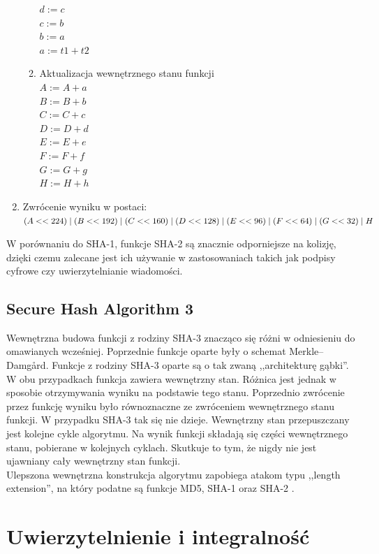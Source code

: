 \begin{enumerate}
\begin{enumerate}
		        $d := c$ \\
		        $c := b$ \\
		        $b := a$ \\
		        $a := t1 + t2$
			\item Aktualizacja wewnętrznego stanu funkcji \\
				$A := A + a$ \\
				$B := B + b$ \\
				$C := C + c$ \\
				$D := D + d$ \\
				$E := E + e$ \\
				$F := F + f$ \\
				$G := G + g$ \\
				$H := H + h$ 
		\end{enumerate}
	\item Zwrócenie wyniku w postaci: \\
		$(A << 224) \mathrel{|} (B << 192) \mathrel{|} (C << 160) \mathrel{|} \\ 
		 (D << 128) \mathrel{|} (E << 96) \mathrel{|} (F << 64) \mathrel{|} (G << 32) \mathrel{|} H$
\end{enumerate}
W porównaniu do SHA-1, funkcje SHA-2 są znacznie odporniejsze na kolizję, dzięki czemu zalecane jest ich używanie w zastosowaniach takich jak podpisy cyfrowe czy uwierzytelnianie wiadomości.

\subsection{Secure Hash Algorithm 3}
Wewnętrzna budowa funkcji z rodziny SHA-3 znacząco się różni w odniesieniu do omawianych wcześniej. 
Poprzednie funkcje oparte były o schemat Merkle–Damgård. 
Funkcje z rodziny SHA-3 oparte są o tak zwaną ,,architekturę gąbki''. 
W obu przypadkach funkcja zawiera wewnętrzny stan. 
Różnica jest jednak w sposobie otrzymywania wyniku na podstawie tego stanu. 
Poprzednio zwrócenie przez funkcję wyniku było równoznaczne ze zwróceniem wewnętrznego stanu funkcji. 
W przypadku SHA-3 tak się nie dzieje. Wewnętrzny stan przepuszczany jest kolejne cykle algorytmu. 
Na wynik funkcji składają się części wewnętrznego stanu, pobierane w kolejnych cyklach. 
Skutkuje to tym, że nigdy nie jest ujawniany cały wewnętrzny stan funkcji. \\
Ulepszona wewnętrzna konstrukcja algorytmu zapobiega atakom typu ,,length extension'', 
na który podatne są funkcje MD5, SHA-1 oraz SHA-2 \cite{keccak}.

\section{Uwierzytelnienie i integralność}

